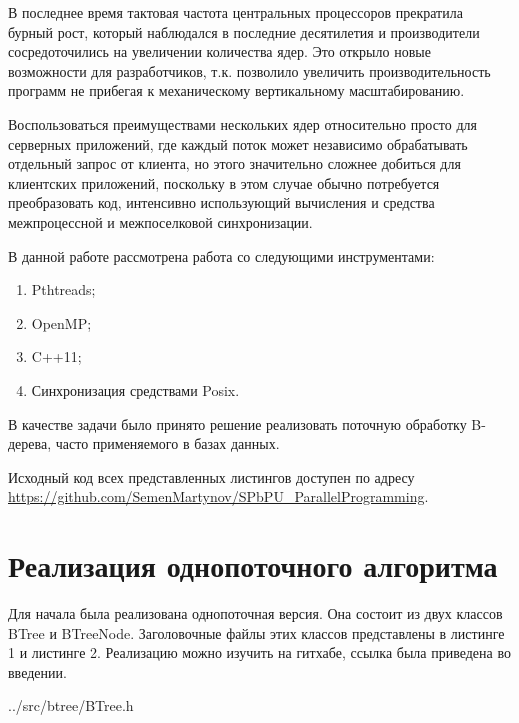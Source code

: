 \documentclass[a4paper, 12pt]{report}		%
\begin{document}
В последнее время тактовая частота центральных процессоров прекратила бурный рост, который наблюдался в последние десятилетия и производители сосредоточились на увеличении количества ядер. Это открыло новые возможности для разработчиков, т.к. позволило увеличить производительность программ не прибегая к механическому вертикальному масштабированию.
\vspace{1em}

Воспользоваться преимуществами нескольких ядер относительно просто для серверных приложений, где каждый поток может независимо обрабатывать отдельный запрос от клиента, но этого значительно сложнее добиться для клиентских приложений, поскольку в этом случае обычно потребуется преобразовать код, интенсивно использующий вычисления и средства межпроцессной и межпоселковой синхронизации.
\vspace{1em}

В данной работе рассмотрена работа со следующими инструментами:

\begin{enumerate}
    \item Pthtreads;
    \item OpenMP;
    \item C++11;
    \item Синхронизация средствами Posix.
\end{enumerate}

В качестве задачи было принято решение реализовать поточную обработку B-дерева, часто применяемого в базах данных.

\vspace{1em}
Исходный код всех представленных листингов доступен по адресу \\ \url{https://github.com/SemenMartynov/SPbPU_ParallelProgramming}.


\chapter*{Реализация однопоточного алгоритма}

Для начала была реализована однопоточная версия. Она состоит из двух классов BTree и BTreeNode. Заголовочные файлы этих классов представлены в листинге 1 и листинге 2. Реализацию можно изучить на гитхабе, ссылка была приведена во введении.


{../src/btree/BTree.h}
\end{document}
